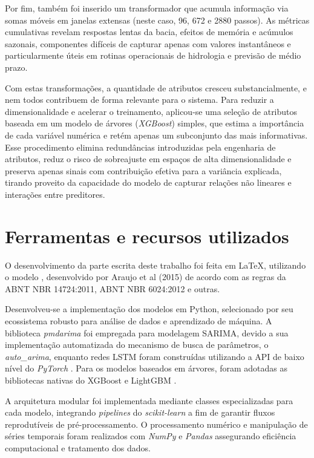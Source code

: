 Por fim, também foi inserido um transformador que acumula informação via somas móveis em janelas extensas (neste caso,
96, 672 e 2880 passos). As métricas cumulativas revelam respostas lentas da bacia, efeitos de memória e acúmulos
sazonais, componentes difíceis de capturar apenas com valores instantâneos e particularmente úteis em rotinas
operacionais de hidrologia e previsão de médio prazo.

Com estas transformações, a quantidade de atributos cresceu substancialmente, e nem todos contribuem de forma relevante
para o sistema. Para reduzir a dimensionalidade e acelerar o treinamento, aplicou-se uma seleção de atributos baseada em
um modelo de árvores (\textit{XGBoost}) simples, que estima a importância de cada variável numérica e retém apenas um
subconjunto das mais informativas. Esse procedimento elimina redundâncias introduzidas pela engenharia de atributos,
reduz o risco de sobreajuste em espaços de alta dimensionalidade e preserva apenas sinais com contribuição efetiva para
a variância explicada, tirando proveito da capacidade do modelo de capturar relações não lineares e interações entre
preditores.


\section{Ferramentas e recursos utilizados}
O desenvolvimento da parte escrita deste trabalho foi feita em \LaTeX, utilizando o modelo \abnTeX, desenvolvido por
Araujo et al (2015) \cite{abntex2classe} de acordo com as regras da ABNT NBR 14724:2011, ABNT NBR 6024:2012 e outras.

Desenvolveu-se a implementação dos modelos em Python, selecionado por seu ecossistema robusto para análise de dados e
aprendizado de máquina. A biblioteca \textit{pmdarima} \cite{pmdarima} foi empregada para modelagem SARIMA, devido a sua
implementação automatizada do mecanismo de busca de parâmetros, o \textit{auto\_arima}, enquanto redes LSTM foram
construídas utilizando a API de baixo nível do \textit{PyTorch} \cite{pytoch}. Para os modelos baseados em árvores,
foram adotadas as bibliotecas nativas do XGBoost \cite{chen_xgboost} e LightGBM \cite{lightgbm}. 

A arquitetura modular foi implementada mediante classes especializadas para cada modelo, integrando \textit{pipelines}
do \textit{scikit-learn} a fim de garantir fluxos reprodutíveis de pré-processamento. O processamento numérico e
manipulação de séries temporais foram realizados com \textit{NumPy} e \textit{Pandas} assegurando eficiência
computacional e tratamento dos dados.

